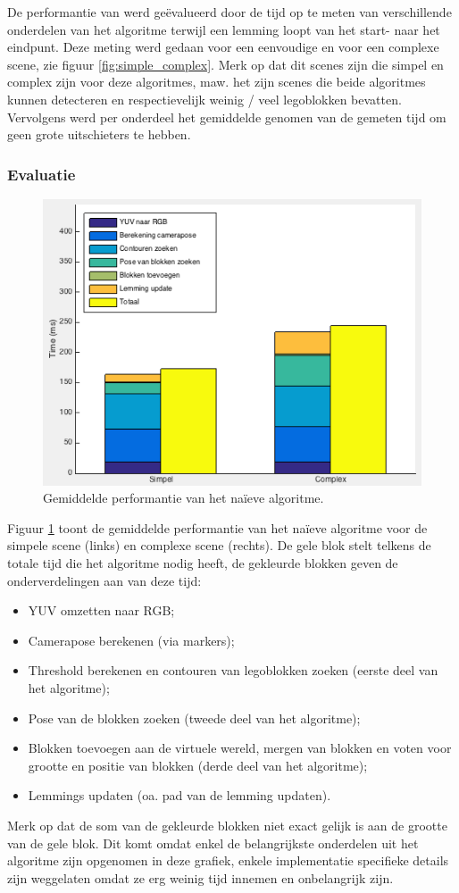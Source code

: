 De performantie van werd ge\"evalueerd door de tijd op te meten van verschillende onderdelen van het algoritme terwijl een lemming loopt van het start- naar het eindpunt. Deze meting werd gedaan voor een eenvoudige en voor een complexe scene, zie figuur \ref{fig:simple_complex}. Merk op dat dit scenes zijn die simpel en complex zijn voor deze algoritmes, maw. het zijn scenes die beide algoritmes kunnen detecteren en respectievelijk weinig / veel legoblokken bevatten. Vervolgens werd per onderdeel het gemiddelde genomen van de gemeten tijd om geen grote uitschieters te hebben.

\subsubsection*{Evaluatie}

\begin{figure}
  \centering
  \includegraphics[width=.75\linewidth]{img/naivePerf}
  \caption{Gemiddelde performantie van het na\"ieve algoritme.}
  \label{fig:perf_algo1}
\end{figure}

Figuur \ref{fig:perf_algo1} toont de gemiddelde performantie van het na\"ieve algoritme voor de simpele scene (links) en complexe scene (rechts). De gele blok stelt telkens de totale tijd die het algoritme nodig heeft, de gekleurde blokken geven de onderverdelingen aan van deze tijd: 
\begin{itemize}
\item YUV omzetten naar RGB;
\item Camerapose berekenen (via markers);
\item Threshold berekenen en contouren van legoblokken zoeken (eerste deel van het algoritme);
\item Pose van de blokken zoeken (tweede deel van het algoritme);
\item Blokken toevoegen aan de virtuele wereld, mergen van blokken en voten voor grootte en positie van blokken (derde deel van het algoritme);
\item Lemmings updaten (oa. pad van de lemming updaten).
\end{itemize}
Merk op dat de som van de gekleurde blokken niet exact gelijk is aan de grootte van de gele blok. Dit komt omdat enkel de belangrijkste onderdelen uit het algoritme zijn opgenomen in deze grafiek, enkele implementatie specifieke details zijn weggelaten omdat ze erg weinig tijd innemen en onbelangrijk zijn.

